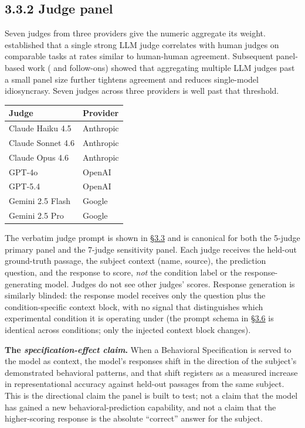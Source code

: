 \hypertarget{judge-panel}{%
\subsection{3.3.2 Judge panel}\label{judge-panel}}

Seven judges from three providers give the numeric aggregate its weight.
\citet{zheng2023judging} established that a single strong LLM judge
correlates with human judges on comparable tasks at rates similar to
human-human agreement. Subsequent panel-based work (\citet{verga2024juries}
and follow-ons) showed that aggregating multiple LLM judges past a small
panel size further tightens agreement and reduces single-model
idiosyncrasy. Seven judges across three providers is well past that
threshold.

\begin{longtable}[]{@{}ll@{}}
\toprule
Judge & Provider \\
\midrule
\endhead
Claude Haiku 4.5 & Anthropic \\
Claude Sonnet 4.6 & Anthropic \\
Claude Opus 4.6 & Anthropic \\
GPT-4o & OpenAI \\
GPT-5.4 & OpenAI \\
Gemini 2.5 Flash & Google \\
Gemini 2.5 Pro & Google \\
\bottomrule
\end{longtable}

The verbatim judge prompt is shown in \hyperref[scoring-rubric-with-calibrated-llm-judge-panel]{§3.3} and is canonical for both the
5-judge primary panel and the 7-judge sensitivity panel. Each judge
receives the held-out ground-truth passage, the subject context (name,
source), the prediction question, and the response to score, \emph{not}
the condition label or the response-generating model. Judges do not see
other judges' scores. Response generation is similarly blinded: the
response model receives only the question plus the condition-specific
context block, with no signal that distinguishes which experimental
condition it is operating under (the prompt schema in \hyperref[response-models]{§3.6} is identical
across conditions; only the injected context block changes).

\textbf{The \emph{specification-effect claim}.} When a Behavioral
Specification is served to the model as context, the model's responses
shift in the direction of the subject's demonstrated behavioral
patterns, and that shift registers as a measured increase in
representational accuracy against held-out passages from the same
subject. This is the directional claim the panel is built to test; not a
claim that the model has gained a new behavioral-prediction capability,
and not a claim that the higher-scoring response is the absolute
``correct'' answer for the subject.

